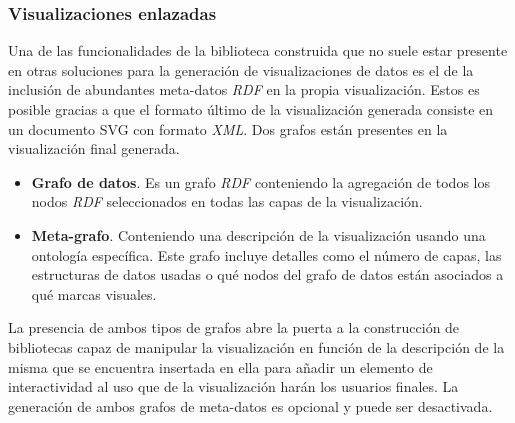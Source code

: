 \subsubsection{Visualizaciones enlazadas}

Una de las funcionalidades de la biblioteca construida que no suele estar presente en otras soluciones para la generaci\'on de visualizaciones de datos es el de la inclusi\'on de abundantes meta-datos \textit{RDF} en la propia visualizaci\'on. Estos es posible gracias a que el formato \'ultimo de la visualizaci\'on generada consiste en un documento SVG con formato \textit{XML}. Dos grafos est\'an presentes en la visualizaci\'on final generada.

\begin{itemize}
\item \textbf{Grafo de datos}. Es un grafo \textit{RDF} conteniendo la agregaci\'on de todos los nodos \textit{RDF} seleccionados en todas las capas de la visualizaci\'on.
\item \textbf{Meta-grafo}. Conteniendo una descripci\'on de la visualizaci\'on usando una ontolog\'ia espec\'ifica. Este grafo incluye detalles como el n\'umero de capas, las estructuras de datos usadas o qu\'e nodos del grafo de datos est\'an asociados a qu\'e marcas visuales.
\end{itemize}

La presencia de ambos tipos de grafos abre la puerta a la construcci\'on de bibliotecas capaz de manipular la visualizaci\'on en funci\'on de la descripci\'on de la misma que se encuentra insertada en ella para a\~nadir un elemento de interactividad al uso que de la visualizaci\'on har\'an los usuarios finales. La generaci\'on de ambos grafos de meta-datos es opcional y puede ser desactivada.